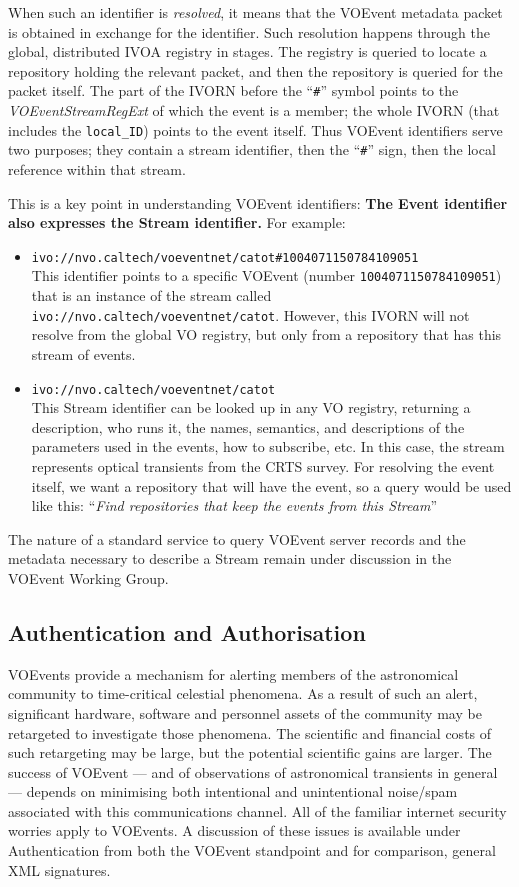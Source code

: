 \documentclass[11pt,a4paper]{ivoa}
\begin{document}
When such an identifier is \emph{resolved}, it means that the VOEvent metadata 
packet is obtained in exchange for the identifier. Such resolution happens 
through the global, distributed IVOA registry in stages. The registry is queried
to locate a repository holding the relevant packet, and then the repository is 
queried for the packet itself. The part of the IVORN before the ``{\tt\#}'' 
symbol points to the \emph{VOEventStreamRegExt} of which the event is a member;
the whole IVORN (that includes the {\tt local\_ID}) points to the event itself.
Thus VOEvent identifiers serve two purposes; they contain a stream identifier,
then the ``{\tt\#}'' sign, then the local reference within that stream. 

This is a key point in understanding VOEvent identifiers: {\bf The Event 
identifier also expresses the Stream identifier.} For example: 
\begin{itemize}
\item {\tt ivo://nvo.caltech/voeventnet/catot\#1004071150784109051}\\
This identifier points to a specific VOEvent (number {\tt 1004071150784109051})
that is an instance of the stream called {\tt 
ivo://nvo.caltech/voeventnet/catot}. However, this IVORN will not resolve from 
the global VO registry, but only from a repository that has this stream of 
events. 
\item {\tt ivo://nvo.caltech/voeventnet/catot}\\
This Stream identifier can be looked up in any VO registry, returning a 
description, who runs it, the names, semantics, and descriptions of the 
parameters used in the events, how to subscribe, etc. In this case, the stream 
represents optical transients from the CRTS survey. For resolving the event 
itself, we want a repository that will have the event, so a query would be used
like this: ``\emph{Find repositories that keep the events from this Stream}'' 
\end{itemize}

The nature of a standard service to query VOEvent server records and the 
metadata necessary to describe a Stream remain under discussion in the VOEvent
Working Group. 

\subsection{Authentication and Authorisation}
\label{sec:2.3}
VOEvents provide a mechanism for alerting members of the astronomical community
to time-critical celestial phenomena. As a result of such an alert, significant
hardware, software and personnel assets of the community may be retargeted to
investigate those phenomena. The scientific and financial costs of such 
retargeting may be large, but the potential scientific gains are larger. The 
success of VOEvent --- and of observations of astronomical transients in general
--- depends on minimising both intentional and unintentional noise/spam 
associated with this communications channel. All of the familiar internet 
security worries apply to VOEvents. A discussion of these issues is available 
under Authentication \citep{bib34} from both the VOEvent standpoint and for 
comparison, general XML signatures. 
\end{document}
